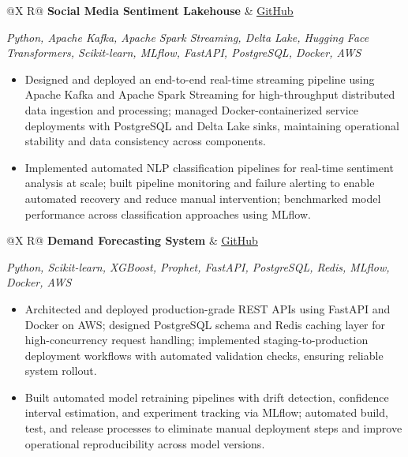 \documentclass[a4paper,10pt]{article}
\newcommand{\ulink}[2]{\href{#1}{\uline{#2}}}
\newcommand{\subheading}[1]{{\color[HTML]{0A0A0A}\fontsize{12}{14}\selectfont\bfseries #1}}
\newcommand{\techstack}[1]{{\color[HTML]{5C5C5C}\fontsize{10.5}{12.5}\selectfont\itshape #1}}
\newcommand{\meta}[1]{{\color[HTML]{5C5C5C}\fontsize{10.5}{12.5}\selectfont #1}}
\begin{document}
\begin{tabularx}{\linewidth}{@{}X R@{}}
\subheading{Social Media Sentiment Lakehouse} & \meta{\ulink{https://github.com/su-jin1425/Social-Media-Sentiment-Lakehouse}{GitHub}}
\end{tabularx}
\vspace{1pt}
\techstack{Python, Apache Kafka, Apache Spark Streaming, Delta Lake, Hugging Face Transformers, Scikit-learn, MLflow, FastAPI, PostgreSQL, Docker, AWS}
\begin{itemize}[nosep, leftmargin=1.5em, itemsep=1pt, topsep=2pt]
\item {\color[HTML]{0A0A0A}\fontsize{11}{14}\selectfont
Designed and deployed an end-to-end real-time streaming pipeline using Apache Kafka and Apache Spark Streaming for high-throughput distributed data ingestion and processing; managed Docker-containerized service deployments with PostgreSQL and Delta Lake sinks, maintaining operational stability and data consistency across components.}
\item {\color[HTML]{0A0A0A}\fontsize{11}{14}\selectfont
Implemented automated NLP classification pipelines for real-time sentiment analysis at scale; built pipeline monitoring and failure alerting to enable automated recovery and reduce manual intervention; benchmarked model performance across classification approaches using MLflow.}
\end{itemize}

\vspace{4pt}

\begin{tabularx}{\linewidth}{@{}X R@{}}
\subheading{Demand Forecasting System} & \meta{\ulink{https://github.com/su-jin1425/Demand-Forecasting-System}{GitHub}}
\end{tabularx}
\vspace{1pt}
\techstack{Python, Scikit-learn, XGBoost, Prophet, FastAPI, PostgreSQL, Redis, MLflow, Docker, AWS}
\begin{itemize}[nosep, leftmargin=1.5em, itemsep=1pt, topsep=2pt]
\item {\color[HTML]{0A0A0A}\fontsize{11}{14}\selectfont
Architected and deployed production-grade REST APIs using FastAPI and Docker on AWS; designed PostgreSQL schema and Redis caching layer for high-concurrency request handling; implemented staging-to-production deployment workflows with automated validation checks, ensuring reliable system rollout.}
\item {\color[HTML]{0A0A0A}\fontsize{11}{14}\selectfont
Built automated model retraining pipelines with drift detection, confidence interval estimation, and experiment tracking via MLflow; automated build, test, and release processes to eliminate manual deployment steps and improve operational reproducibility across model versions.}
\end{itemize}
\newpage
\vspace{4pt}
\end{document}
